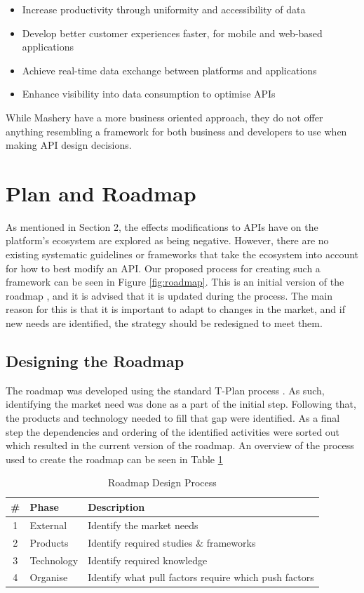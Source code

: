 \documentclass{article}
\begin{document}
\begin{itemize}
\item Increase productivity through uniformity and accessibility of data
\item Develop better customer experiences faster, for mobile and web-based applications
\item Achieve real-time data exchange between platforms and applications
\item Enhance visibility into data consumption to optimise APIs
\end{itemize}

While Mashery have a more business oriented approach, they do not offer anything resembling a framework for both business and developers to use when making API design decisions.

\section{Plan and Roadmap}
As mentioned in Section 2, the effects modifications to APIs have on the platform’s ecosystem are explored as being negative. However, there are no existing systematic guidelines or frameworks that take the ecosystem into account for how to best modify an API. Our proposed process for creating such a framework can be seen in Figure \ref{fig:roadmap}. This is an initial version of the roadmap \cite{phaal2004technology}, and it is advised that it is updated during the process. The main reason for this is that it is important to adapt to changes in the market, and if new needs are identified, the strategy should be redesigned to meet them. 

\subsection{Designing the Roadmap}
The roadmap was developed using the standard T-Plan process \cite{phaal2004technology}. As such, identifying the market need was done as a part of the initial step. Following that, the products and technology needed to fill that gap were identified. As a final step the dependencies and ordering of the identified activities were sorted out which resulted in the current version of the roadmap. An overview of the process used to create the roadmap can be seen in Table \ref{tab:proc}

\begin{table}[ht]
\centering
\begin{tabular}[ht]{|c|l|l|}
\hline
\textbf{\#} & \textbf{Phase} & \textbf{Description} \\
\hline
1 & External & Identify the market needs \\
\hline
2 & Products & Identify required studies \& frameworks \\
\hline
3 & Technology & Identify required knowledge \\
\hline
4 & Organise & Identify what pull factors require which push factors \\
\hline
\end{tabular}
\caption{Roadmap Design Process}
\label{tab:proc}
\end{table}
\end{document}
